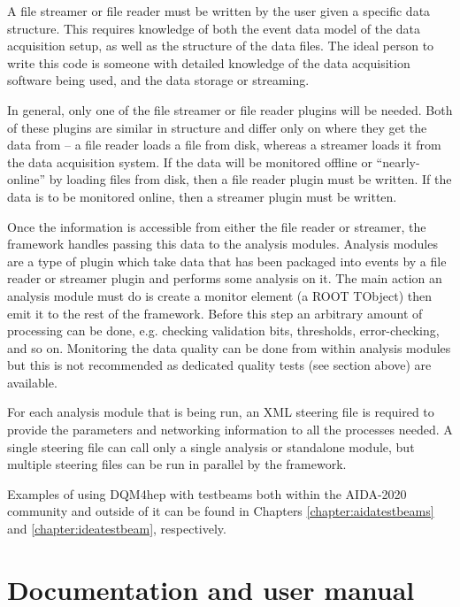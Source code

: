 A file streamer or file reader must be written by the user given a specific data structure. This requires knowledge of both the event data model of the data acquisition setup, as well as the structure of the data files. The ideal person to write this code is someone with detailed knowledge of the data acquisition software being used, and the data storage or streaming. 

In general, only one of the file streamer or file reader plugins will be needed. Both of these plugins are similar in structure and differ only on where they get the data from -- a file reader loads a file from disk, whereas a streamer loads it from the data acquisition system. If the data will be monitored offline or ``nearly-online'' by loading files from disk, then a file reader plugin must be written. If the data is to be monitored online, then a streamer plugin must be written. 

Once the information is accessible from either the file reader or streamer, the framework handles passing this data to the analysis modules. Analysis modules are a type of plugin which take data that has been packaged into events by a file reader or streamer plugin and performs some analysis on it. The main action an analysis module must do is create a monitor element (a ROOT TObject) then emit it to the rest of the framework. Before this step an arbitrary amount of processing can be done, e.g. checking validation bits, thresholds, error-checking, and so on. Monitoring the data quality can be done from within analysis modules but this is not recommended as dedicated quality tests (see section above) are available.

For each analysis module that is being run, an XML steering file is required to provide the parameters and networking information to all the processes needed. A single steering file can call only a single analysis or standalone module, but multiple steering files can be run in parallel by the framework.

Examples of using DQM4hep with testbeams both within the AIDA-2020 community and outside of it can be found in Chapters \ref{chapter:aidatestbeams} and \ref{chapter:ideatestbeam}, respectively.

\section{Documentation and user manual} %

